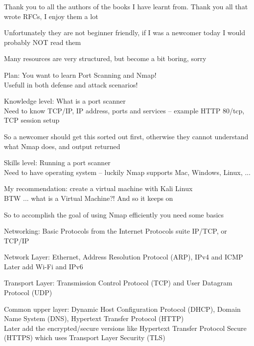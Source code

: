 \documentclass[Screen16to9,17pt]{foils}
\begin{document}
\begin{list2}
\item Thank you to all the authors of the books I have learnt from. Thank you all that wrote RFCs, I enjoy them a lot
\item Unfortunately they are not beginner friendly, if I was a newcomer today I would probably NOT read them
\item Many resources are very structured, but become a bit boring, sorry
\end{list2}


{\Large Plan: You want to learn Port Scanning and Nmap! \\
Usefull in both defense and attack scenarios!}

\begin{list2}
\item Knowledge level: What is a port scanner\\
Need to know TCP/IP, IP address, ports and services -- example HTTP 80/tcp, TCP session setup
\end{list2}

So a newcomer should get this sorted out first, otherwise they cannot understand what Nmap does, and output returned



\begin{list2}
\item Skills level: Running a port scanner\\
Need to have operating system -- luckily Nmap supports Mac, Windows, Linux, ...
\item My recommendation: create a virtual machine with Kali Linux\\
BTW ... what is a Virtual Machine?! And so it keeps on
\end{list2}



So to accomplish the goal of using Nmap efficiently you need some basics

Networking: Basic Protocols from the Internet Protocols suite IP/TCP, or TCP/IP
\begin{list2}
\item Network Layer: Ethernet, Address Resolution Protocol (ARP), IPv4 and ICMP\\
Later add Wi-Fi and IPv6
\item Transport Layer: Transmission Control Protocol (TCP) and User Datagram Protocol (UDP)
\item Common upper layer: Dynamic Host Configuration Protocol (DHCP), Domain Name System (DNS),
Hypertext Transfer Protocol (HTTP)\\
Later add the encrypted/secure versions like Hypertext Transfer Protocol Secure (HTTPS) which uses Transport Layer Security (TLS)
\end{list2}
\end{document}
